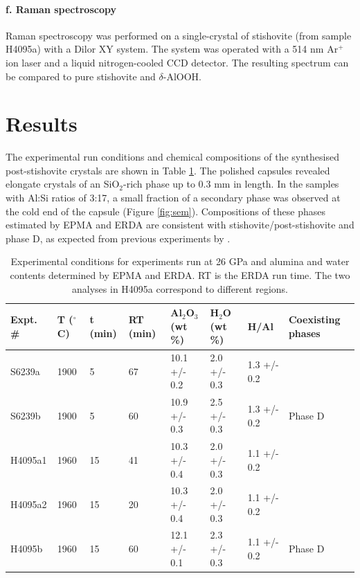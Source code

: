\documentclass[review]{elsarticle}
\begin{document}
\paragraph{f. Raman spectroscopy}
Raman spectroscopy was performed on a single-crystal of stishovite (from sample H4095a) with a Dilor XY system. The system was operated with a 514 nm Ar$^+$ ion laser and a liquid nitrogen-cooled CCD detector. The resulting spectrum can be compared to pure stishovite and $\delta$-AlOOH. 


\clearpage
\section{Results}
The experimental run conditions and chemical compositions of the synthesised post-stishovite crystals are shown in Table \ref{tab:results}. The polished capsules revealed elongate crystals of an SiO$_2$-rich phase up to 0.3 mm in length. In the samples with Al:Si ratios of 3:17, a small fraction of a secondary phase was observed at the cold end of the capsule (Figure \ref{fig:sem}). Compositions of these phases estimated by EPMA and ERDA are consistent with stishovite/post-stishovite and phase D, as expected from previous experiments by \cite{Pamatoetal2015}.

\begin{table}[ht!]
\centering
\caption{Experimental conditions for experiments run at 26 GPa and alumina and water contents determined by EPMA and ERDA. RT is the ERDA run time. The two analyses in H4095a correspond to different regions.}
\label{tab:results}
\begin{tabular}{llllllll}
  Expt. \# & T ($^{\circ}$C) & t (min) & RT (min) & Al$_2$O$_3$ (wt \%) & H$_2$O (wt \%) & H/Al        & Coexisting phases \\
  \hline
  S6239a   & 1900  & 5  & 67 & 10.1 +/- 0.2  & 2.0 +/- 0.3 & 1.3 +/- 0.2 &                   \\
  S6239b   & 1900  & 5  & 60 & 10.9 +/- 0.3  & 2.5 +/- 0.3 & 1.3 +/- 0.2 & Phase D           \\
  H4095a1  & 1960  & 15 & 41 & 10.3 +/- 0.4  & 2.0 +/- 0.3 & 1.1 +/- 0.2 &                   \\
  H4095a2  & 1960  & 15 & 20 & 10.3 +/- 0.4  & 2.0 +/- 0.3 & 1.1 +/- 0.2 &                   \\
  H4095b   & 1960  & 15 & 60 & 12.1 +/- 0.1  & 2.3 +/- 0.3 & 1.1 +/- 0.2 & Phase D          
\end{tabular}
\end{table}
\end{document}
